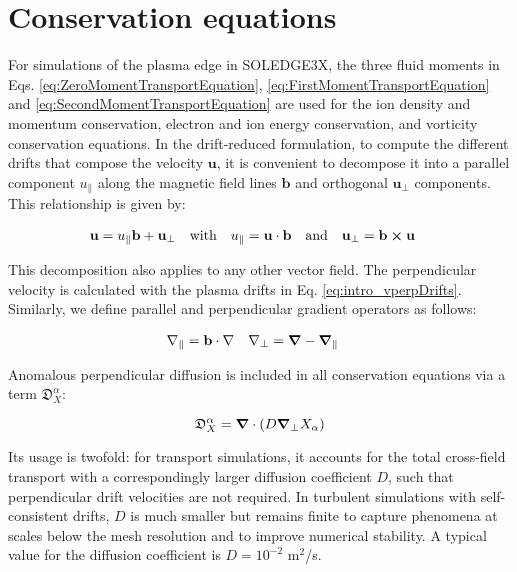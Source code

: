 \section{Conservation equations}
\label{sec:S3X_TransportEquations}

For simulations of the plasma edge in SOLEDGE3X, the three fluid moments in Eqs. \ref{eq:ZeroMomentTransportEquation}, \ref{eq:FirstMomentTransportEquation} and \ref{eq:SecondMomentTransportEquation} are used for the ion density and momentum conservation, electron and ion energy conservation, and vorticity conservation equations. In the drift-reduced formulation, to compute the different drifts that compose the velocity $\mathbf{u}$, it is convenient to decompose it into a parallel component $u_\parallel$ along the magnetic field lines $\mathbf{b}$ and orthogonal $\mathbf{u}_\perp$ components. This relationship is given by:

\begin{align}
	\label{eq:RelationPerpParallelVelocity}
	\mathbf{u} &= u_\parallel \mathbf{b} + \mathbf{u}_\perp & \text{with} \quad u_\parallel = \mathbf{u}\cdot\mathbf{b} \quad &\text{and} \quad \mathbf{u}_\perp = \mathbf{b}\cross\mathbf{u}
\end{align}

This decomposition also applies to any other vector field. The perpendicular velocity is calculated with the plasma drifts in Eq. \ref{eq:intro_vperpDrifts}. Similarly, we define parallel and perpendicular gradient operators as follows:

\begin{align}
	\nabla_\parallel &= \mathbf{b}\cdot\nabla & \nabla_\perp &= \grad - \grad_\parallel
\end{align}

Anomalous perpendicular diffusion is included in all conservation equations via a term $\mathfrak{D}_X^\alpha$:

\begin{equation}
	\mathfrak{D}_X^\alpha = \grad\cdot\left(D\grad_\perp X_\alpha\right)
\end{equation}

Its usage is twofold: for transport simulations, it accounts for the total cross-field transport with a correspondingly larger diffusion coefficient $D$, such that perpendicular drift velocities are not required. In turbulent simulations with self-consistent drifts, $D$ is much smaller but remains finite to capture phenomena at scales below the mesh resolution and to improve numerical stability. A typical value for the diffusion coefficient is $D = 10^{-2}$ m$^2$/s. \\

